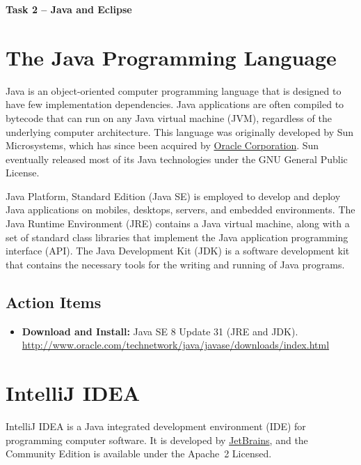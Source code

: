 \documentclass[letterpaper,11pt]{article}
\begin{document}
\begin{center}
{\bfseries \LARGE Task 2 -- Java and Eclipse\\[8mm]}
\end{center}

\section{The Java Programming Language}

Java is an object-oriented computer programming language that is designed to have few implementation dependencies.
Java applications are often compiled to bytecode that can run on any Java virtual machine (JVM), regardless of the underlying computer architecture.
This language was originally developed by Sun Microsystems, which has since been acquired by \href{http://www.oracle.com}{Oracle Corporation}.
Sun eventually released most of its Java technologies under the GNU General Public License.

Java Platform, Standard Edition (Java SE) is employed to develop and deploy Java applications on mobiles, desktops, servers, and embedded environments.
The Java Runtime Environment (JRE) contains a Java virtual machine, along with a set of standard class libraries that implement the Java application programming interface (API).
The Java Development Kit (JDK) is a software development kit that contains the necessary tools for the writing and running of Java programs.

\subsection*{Action Items}

\begin{itemize}
\item \textbf{Download and Install:} Java SE 8 Update 31 (JRE and JDK). \\
\url{http://www.oracle.com/technetwork/java/javase/downloads/index.html}
\end{itemize}


\section{IntelliJ IDEA}

IntelliJ IDEA is a Java integrated development environment (IDE) for programming computer software.
It is developed by \href{https://www.jetbrains.com}{JetBrains}, and the Community Edition is available under the Apache~2 Licensed.
\end{document}

